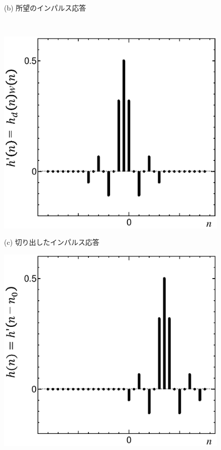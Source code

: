 \begin{figure}[H]
\begin{center}
\begin{minipage}{.38\textwidth}
\begin{center}
(b) 所望のインパルス応答
\end{center}
\end{minipage}\\[.3\baselineskip]
\begin{minipage}{.38\textwidth}
\begin{center}
\includegraphics[width=.98\textwidth]{fig/zu-6-12-c.eps}

(c) 切り出したインパルス応答
\end{center}
\end{minipage}
\begin{minipage}{.38\textwidth}
\begin{center}
\includegraphics[width=.98\textwidth]{fig/zu-6-12-d.eps}


\end{center}
\end{minipage}
\end{center}
\end{figure}
